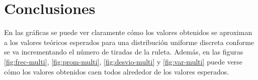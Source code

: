 \section{Conclusiones}

En las gráficas se puede ver claramente cómo los valores obtenidos se aproximan a los valores teóricos esperados para una distribución uniforme discreta conforme se va incrementando el número de tiradas de la ruleta. Además, en las figuras \ref{fig:frec-multi}, \ref{fig:prom-multi}, \ref{fig:desvio-multi} y \ref{fig:var-multi} puede verse cómo los valores obtenidos caen todos alrededor de los valores esperados.
